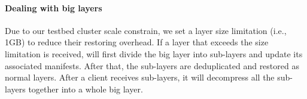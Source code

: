 \paragraph{Dealing with big layers}
Due to our testbed cluster scale constrain,
we set a layer size limitation (i.e., 1GB) to reduce their restoring overhead.
If a layer that exceeds the size limitation is received,
\sysname will first divide the big layer into sub-layers and update its associated manifests.
After that,
the sub-layers are deduplicated and restored as normal layers.
After a client receives sub-layers,   
it will decompress all the sub-layers together into a whole big layer.
%
%
%

